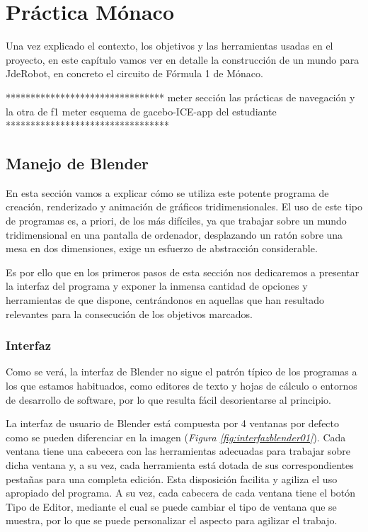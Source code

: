 \chapter{Práctica Mónaco}
\label{ch:PracticaMonaco}

Una vez explicado el contexto, los objetivos y las herramientas usadas en el proyecto, en este capítulo vamos ver en detalle la construcción de un mundo para JdeRobot, en concreto el circuito de Fórmula 1 de Mónaco.




********************************
meter sección las prácticas de navegación y la otra de f1
meter esquema de gacebo-ICE-app del estudiante
*********************************


\section{Manejo de Blender}
\label{sec:pm_manejodeblender}

En esta sección vamos a explicar cómo se utiliza este potente programa de creación, renderizado y animación de gráficos tridimensionales. El uso de este tipo de programas es, a priori, de los más difíciles, ya que trabajar sobre un mundo tridimensional en una pantalla de ordenador, desplazando un ratón sobre una mesa en dos dimensiones, exige un esfuerzo de abstracción considerable.


Es por ello que en los primeros pasos de esta sección nos dedicaremos a presentar la interfaz del programa y exponer la inmensa cantidad de opciones y herramientas de que dispone, centrándonos en aquellas que han resultado relevantes para la consecución de los objetivos marcados.


\subsection{Interfaz}
\label{subsec:pm_interfaz}

Como se verá, la interfaz de Blender no sigue el patrón típico de los programas a los que estamos habituados, como editores de texto y hojas de cálculo o entornos de desarrollo de software, por lo que resulta fácil desorientarse al principio.

La interfaz de usuario de Blender está compuesta por 4 ventanas por defecto como se pueden diferenciar en la imagen (\textit{Figura \ref{fig:interfazblender01}}). Cada ventana tiene una cabecera con las herramientas adecuadas para trabajar sobre
dicha ventana y, a su vez, cada herramienta está dotada de sus correspondientes pestañas para una completa edición. Esta disposición facilita y agiliza el uso apropiado del programa. A su vez, cada cabecera de cada ventana tiene el botón Tipo de Editor, mediante el cual se puede cambiar el tipo de ventana que se muestra, por lo que se puede personalizar el aspecto para agilizar el trabajo.

